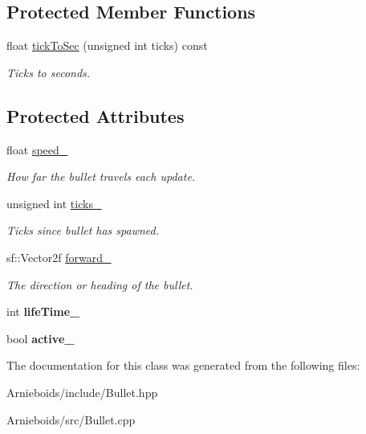 \subsection*{Protected Member Functions}
\begin{DoxyCompactItemize}
\item 
\hypertarget{class_bullet_a27f956e0fe2c7e1da53bff8aecfb87b1}{}float \hyperlink{class_bullet_a27f956e0fe2c7e1da53bff8aecfb87b1}{tick\+To\+Sec} (unsigned int ticks) const \label{class_bullet_a27f956e0fe2c7e1da53bff8aecfb87b1}

\begin{DoxyCompactList}\small\item\em Ticks to seconds. \end{DoxyCompactList}\end{DoxyCompactItemize}
\subsection*{Protected Attributes}
\begin{DoxyCompactItemize}
\item 
\hypertarget{class_bullet_a6fb156b4f69194ca4e6b2c1b23887902}{}float \hyperlink{class_bullet_a6fb156b4f69194ca4e6b2c1b23887902}{speed\+\_\+}\label{class_bullet_a6fb156b4f69194ca4e6b2c1b23887902}

\begin{DoxyCompactList}\small\item\em How far the bullet travels each update. \end{DoxyCompactList}\item 
\hypertarget{class_bullet_a04d2c6f850e61e353b5c84b55f42a6f8}{}unsigned int \hyperlink{class_bullet_a04d2c6f850e61e353b5c84b55f42a6f8}{ticks\+\_\+}\label{class_bullet_a04d2c6f850e61e353b5c84b55f42a6f8}

\begin{DoxyCompactList}\small\item\em Ticks since bullet has spawned. \end{DoxyCompactList}\item 
\hypertarget{class_bullet_a7bc86024912fd5c74aee5c1de7bb3130}{}sf\+::\+Vector2f \hyperlink{class_bullet_a7bc86024912fd5c74aee5c1de7bb3130}{forward\+\_\+}\label{class_bullet_a7bc86024912fd5c74aee5c1de7bb3130}

\begin{DoxyCompactList}\small\item\em The direction or heading of the bullet. \end{DoxyCompactList}\item 
\hypertarget{class_bullet_ae23efe218426ce94127db9d8baac29dd}{}int {\bfseries life\+Time\+\_\+}\label{class_bullet_ae23efe218426ce94127db9d8baac29dd}

\item 
\hypertarget{class_bullet_a46cc668478d5c798e4cbe85a56f14939}{}bool {\bfseries active\+\_\+}\label{class_bullet_a46cc668478d5c798e4cbe85a56f14939}

\end{DoxyCompactItemize}


The documentation for this class was generated from the following files\+:\begin{DoxyCompactItemize}
\item 
Arnieboids/include/Bullet.\+hpp\item 
Arnieboids/src/Bullet.\+cpp\end{DoxyCompactItemize}
